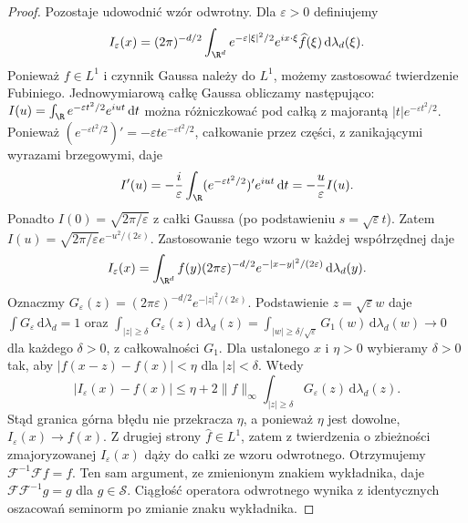\begin{proof}
Pozostaje udowodnić wzór odwrotny. Dla $\varepsilon>0$ definiujemy
\[
I_\varepsilon(x)=(2\pi)^{-d/2}\int_{\R^d}
 e^{-\varepsilon|\xi|^2/2}e^{ix\cdot\xi}
 \widehat f(\xi)\,\mathrm d\lambda_d(\xi).
\]
Ponieważ $f\in L^1$ i czynnik Gaussa należy do $L^1$,
możemy zastosować twierdzenie Fubiniego. Jednowymiarową całkę Gaussa obliczamy następująco:
$I(u)=\int_\R e^{-\varepsilon t^2/2}e^{iut}\,\mathrm dt$
można różniczkować pod całką z majorantą
$|t|e^{-\varepsilon t^2/2}$. Ponieważ
$(e^{-\varepsilon t^2/2})'=-\varepsilon t e^{-\varepsilon t^2/2}$,
całkowanie przez części, z zanikającymi wyrazami brzegowymi, daje
\[
I'(u)=-\frac{i}{\varepsilon}
\int_\R (e^{-\varepsilon t^2/2})'e^{iut}\,\mathrm dt
=-\frac u\varepsilon I(u).
\]
Ponadto $I(0)=\sqrt{2\pi/\varepsilon}$ z całki Gaussa
(po podstawieniu $s=\sqrt\varepsilon t$).
Zatem $I(u)=\sqrt{2\pi/\varepsilon}e^{-u^2/(2\varepsilon)}$.
Zastosowanie tego wzoru w każdej współrzędnej daje
\[
I_\varepsilon(x)=\int_{\R^d}f(y)
(2\pi\varepsilon)^{-d/2}e^{-|x-y|^2/(2\varepsilon)}
\,\mathrm d\lambda_d(y).
\]
Oznaczmy $G_\varepsilon(z)=(2\pi\varepsilon)^{-d/2}
e^{-|z|^2/(2\varepsilon)}$. Podstawienie $z=\sqrt\varepsilon w$
daje $\int G_\varepsilon\,\mathrm d\lambda_d=1$ oraz
$\int_{|z|\ge\delta}G_\varepsilon(z)\,\mathrm d\lambda_d(z)
=\int_{|w|\ge\delta/\sqrt\varepsilon}G_1(w)\,\mathrm d\lambda_d(w)
\to0$ dla każdego $\delta>0$, z całkowalności $G_1$.
Dla ustalonego $x$ i $\eta>0$ wybieramy $\delta>0$ tak,
aby $|f(x-z)-f(x)|<\eta$ dla $|z|<\delta$.
Wtedy
\[
|I_\varepsilon(x)-f(x)|\le
\eta+2\|f\|_\infty
\int_{|z|\ge\delta}G_\varepsilon(z)\,\mathrm d\lambda_d(z).
\]
Stąd granica górna błędu nie przekracza $\eta$, a ponieważ
$\eta$ jest dowolne, $I_\varepsilon(x)\to f(x)$.
Z drugiej strony $\widehat f\in L^1$, zatem
z twierdzenia o zbieżności zmajoryzowanej
$I_\varepsilon(x)$ dąży do całki ze wzoru odwrotnego.
Otrzymujemy $\mathcal F^{-1}\mathcal Ff=f$.
Ten sam argument, ze zmienionym znakiem wykładnika,
daje $\mathcal F\mathcal F^{-1}g=g$ dla $g\in\mathcal S$.
Ciągłość operatora odwrotnego wynika z identycznych
oszacowań seminorm po zmianie znaku wykładnika.
\end{proof}

